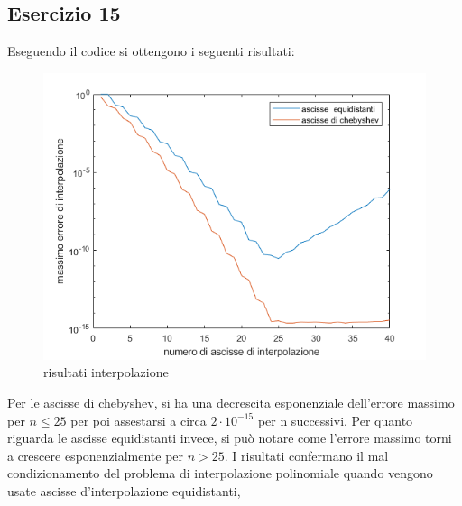 \subsection{Esercizio 15}
Eseguendo il codice  si ottengono i seguenti risultati:

\begin{figure}[h]
    \includegraphics[scale=0.8]{capitolo4/interpol.png}
    \caption{risultati interpolazione}
    \label{fig:15}    
\end{figure}


Per le ascisse di chebyshev, si ha una decrescita esponenziale dell'errore massimo per $ n \le 25$ per poi assestarsi a circa $2\cdot10^{-15}$ per n successivi.
Per quanto riguarda le ascisse equidistanti invece, si può notare come l'errore massimo torni  a crescere esponenzialmente per $n >25$. I risultati confermano
il mal condizionamento del problema di interpolazione polinomiale quando vengono usate ascisse d'interpolazione equidistanti,